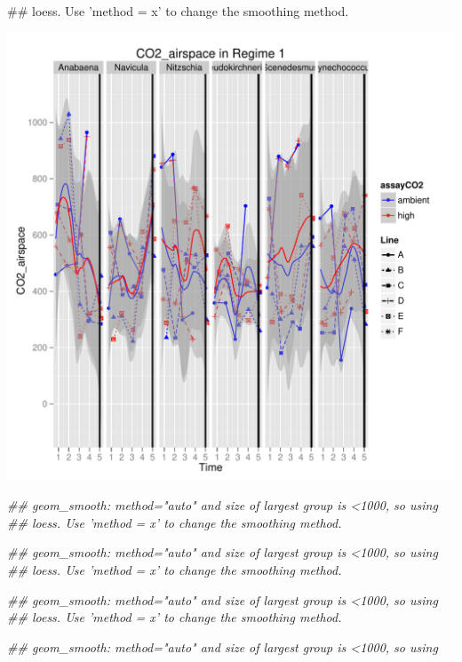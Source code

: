 \documentclass{article}\usepackage{graphicx, color}
\makeatletter
\def\maxwidth{ %
  \ifdim\Gin@nat@width>\linewidth
    \linewidth
  \else
    \Gin@nat@width
  \fi
}
\newenvironment{kframe}{%
 \def\at@end@of@kframe{}%
 \ifinner\ifhmode%
  \def\at@end@of@kframe{\end{minipage}}%
  \begin{minipage}{\columnwidth}%
 \fi\fi%
 \def\FrameCommand##1{\hskip\@totalleftmargin \hskip-\fboxsep
 \colorbox{shadecolor}{##1}\hskip-\fboxsep
     \hskip-\linewidth \hskip-\@totalleftmargin \hskip\columnwidth}%
 \MakeFramed {\advance\hsize-\width
   \@totalleftmargin\z@ \linewidth\hsize
   \@setminipage}}%
 {\par\unskip\endMakeFramed%
 \at@end@of@kframe}
\newenvironment{knitrout}{}{} %
\makeatother
\begin{document}
\begin{knitrout}
\begin{kframe}
\begin{flushleft}
{\#\# loess. Use 'method = x' to change the smoothing method.}\end{flushleft}\end{kframe}\includegraphics[width=\maxwidth]{figure/physical_parameters_figure1} \begin{kframe}\begin{flushleft}\ttfamily\noindent\itshape\textcolor{messagecolor}{\#\# geom\_smooth: method="auto" and size of largest group is <1000, so using \\ 
\#\# loess. Use 'method = x' to change the smoothing method.}\end{flushleft}\begin{flushleft}\ttfamily\noindent\itshape\textcolor{messagecolor}{\#\# geom\_smooth: method="auto" and size of largest group is <1000, so using \\ 
\#\# loess. Use 'method = x' to change the smoothing method.}\end{flushleft}\begin{flushleft}\ttfamily\noindent\itshape\textcolor{messagecolor}{\#\# geom\_smooth: method="auto" and size of largest group is <1000, so using \\ 
\#\# loess. Use 'method = x' to change the smoothing method.}\end{flushleft}\begin{flushleft}\ttfamily\noindent\itshape\textcolor{messagecolor}{\#\# geom\_smooth: method="auto" and size of largest group is <1000, so using \\ 
}
\end{flushleft}
\end{kframe}
\end{knitrout}
\end{document}
